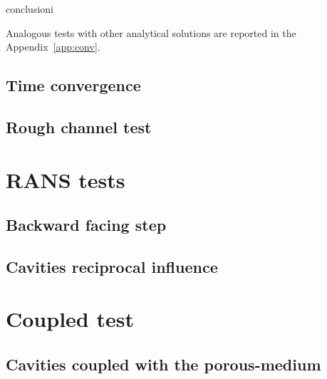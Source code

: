 conclusioni

Analogous tests with other analytical solutions are reported in the 
Appendix~\ref{app:conv}.
%
\subsection{Time convergence}
%
\subsection{Rough channel test}
%
\section{RANS tests}
\subsection{Backward facing step}
\subsection{Cavities reciprocal influence}
\section{Coupled test}
\subsection{Cavities coupled with the porous-medium}
